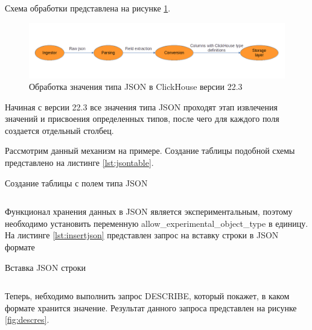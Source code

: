 \documentclass[14pt, russian]{scrartcl}
\begin{document}
Схема обработки представлена на рисунке \ref{fig:jsonprocessing}. 

\begin{figure}[H]
	\centering
	\begin{minipage}[t]{.9\textwidth}
		\centering
		\includegraphics[width=.7\textwidth]{./imgs/ingestion_process_crop.png}
	\end{minipage}
	\caption{Обработка значения типа JSON в ClickHouse версии 22.3}
	\label{fig:jsonprocessing}
\end{figure}

Начиная с версии 22.3 все значения типа JSON проходят
этап извлечения значений и присвоения определенных типов,
после чего для каждого поля создается отдельный столбец.

Рассмотрим данный механизм на примере. Создание таблицы подобной 
схемы представлено на листинге \ref{lst:jsontable}. 


\begin{listing}[H]
	\caption{Создание таблицы с полем типа JSON}
	\label{lst:jsontable}
	\inputminted[style=bw, frame=single,fontsize = \footnotesize, linenos=false, xleftmargin = 1.5em]{sql}{./listings/jsontable.sql}
\end{listing}

Функционал хранения данных в JSON является экспериментальным, поэтому
необходимо установить переменную allow\_experimental\_object\_type в единицу.
На листинге \ref{lst:insertjson} представлен запрос
на вставку строки в JSON формате

\begin{listing}[H]
	\caption{Вставка JSON строки}
	\label{lst:insertjson}
	\inputminted[style=bw, frame=single,fontsize = \footnotesize, linenos=false, xleftmargin = 1.5em]{sql}{./listings/inserjson.sql}
\end{listing}

Теперь, небходимо выполнить запрос DESCRIBE, который
покажет, в каком формате хранится значение. Результат
данного запроса представлен на рисунке \ref{fig:descres}. 
\end{document}
